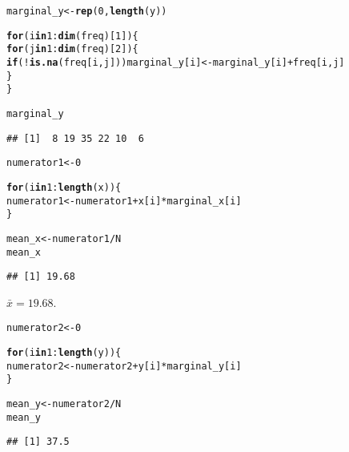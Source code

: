 \documentclass[11pt, a4paper]{article}\usepackage[]{graphicx}\usepackage[]{xcolor}
\makeatletter
\newcommand{\hlnum}[1]{\textcolor[rgb]{0.686,0.059,0.569}{#1}}%
\newcommand{\hlopt}[1]{\textcolor[rgb]{0,0,0}{#1}}%
\newcommand{\hldef}[1]{\textcolor[rgb]{0.345,0.345,0.345}{#1}}%
\newcommand{\hlkwa}[1]{\textcolor[rgb]{0.161,0.373,0.58}{\textbf{#1}}}%
\newcommand{\hlkwb}[1]{\textcolor[rgb]{0.69,0.353,0.396}{#1}}%
\newcommand{\hlkwd}[1]{\textcolor[rgb]{0.737,0.353,0.396}{\textbf{#1}}}%
\newenvironment{kframe}{%
 \def\at@end@of@kframe{}%
 \ifinner\ifhmode%
  \def\at@end@of@kframe{\end{minipage}}%
  \begin{minipage}{\columnwidth}%
 \fi\fi%
 \def\FrameCommand##1{\hskip\@totalleftmargin \hskip-\fboxsep
 \colorbox{shadecolor}{##1}\hskip-\fboxsep
     \hskip-\linewidth \hskip-\@totalleftmargin \hskip\columnwidth}%
 \MakeFramed {\advance\hsize-\width
   \@totalleftmargin\z@ \linewidth\hsize
   \@setminipage}}%
 {\par\unskip\endMakeFramed%
 \at@end@of@kframe}
\newenvironment{knitrout}{}{} %
\makeatother
\begin{document}
\begin{knitrout}
\color{fgcolor}\begin{kframe}
\begin{alltt}
\hldef{marginal_y} \hlkwb{<-} \hlkwd{rep}\hldef{(}\hlnum{0}\hldef{,} \hlkwd{length}\hldef{(y))}

\hlkwa{for} \hldef{(i} \hlkwa{in} \hlnum{1}\hlopt{:}\hlkwd{dim}\hldef{(freq)[}\hlnum{1}\hldef{]) \{}
  \hlkwa{for} \hldef{(j} \hlkwa{in} \hlnum{1}\hlopt{:}\hlkwd{dim}\hldef{(freq)[}\hlnum{2}\hldef{]) \{}
    \hlkwa{if}\hldef{(}\hlopt{!}\hlkwd{is.na}\hldef{(freq[i, j])) marginal_y[i]} \hlkwb{<-} \hldef{marginal_y[i]} \hlopt{+} \hldef{freq[i, j]}
  \hldef{\}}
\hldef{\}}

\hldef{marginal_y}
\end{alltt}
\begin{verbatim}
## [1]  8 19 35 22 10  6
\end{verbatim}
\end{kframe}
\end{knitrout}

\begin{knitrout}
\color{fgcolor}\begin{kframe}
\begin{alltt}
\hldef{numerator1} \hlkwb{<-} \hlnum{0}

\hlkwa{for} \hldef{(i} \hlkwa{in} \hlnum{1}\hlopt{:}\hlkwd{length}\hldef{(x)) \{}
  \hldef{numerator1} \hlkwb{<-} \hldef{numerator1} \hlopt{+} \hldef{x[i]} \hlopt{*} \hldef{marginal_x[i]}
\hldef{\}}

\hldef{mean_x} \hlkwb{<-} \hldef{numerator1} \hlopt{/} \hldef{N}
\hldef{mean_x}
\end{alltt}
\begin{verbatim}
## [1] 19.68
\end{verbatim}
\end{kframe}
\end{knitrout}

$\bar{x} = 19.68$.

\begin{knitrout}
\color{fgcolor}\begin{kframe}
\begin{alltt}
\hldef{numerator2} \hlkwb{<-} \hlnum{0}

\hlkwa{for} \hldef{(i} \hlkwa{in} \hlnum{1}\hlopt{:}\hlkwd{length}\hldef{(y)) \{}
  \hldef{numerator2} \hlkwb{<-} \hldef{numerator2} \hlopt{+} \hldef{y[i]} \hlopt{*} \hldef{marginal_y[i]}
\hldef{\}}

\hldef{mean_y} \hlkwb{<-} \hldef{numerator2} \hlopt{/} \hldef{N}
\hldef{mean_y}
\end{alltt}
\begin{verbatim}
## [1] 37.5
\end{verbatim}
\end{kframe}
\end{knitrout}
\end{document}
